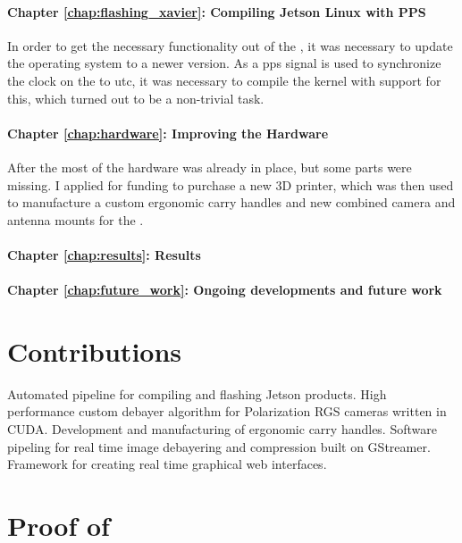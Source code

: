 \paragraph{Chapter \ref{chap:flashing_xavier}: Compiling Jetson Linux with PPS}
In order to get the necessary functionality out of the \jx, it was necessary to update the operating system to a newer version.
As a \gls{pps} signal is used to synchronize the clock on the \jx to \gls{utc}, it was necessary to compile the kernel with support for this, which turned out to be a non-trivial task.

\paragraph{Chapter \ref{chap:hardware}: Improving the Hardware}
After the \preproject most of the hardware was already in place, but some parts were missing.
I applied for funding to purchase a new 3D printer, which was then used to manufacture a custom ergonomic carry handles and new combined camera and antenna mounts for the \sr.

\paragraph{Chapter \ref{chap:results}: Results}


\paragraph{Chapter \ref{chap:future_work}: Ongoing developments and future work}



\section{Contributions}
Automated pipeline for compiling and flashing Jetson products.
High performance custom debayer algorithm for Polarization RGS cameras written in CUDA.
Development and manufacturing of ergonomic carry handles.
Software pipeling for real time image debayering and compression built on GStreamer.
Framework for creating real time graphical web interfaces.

\section{Proof of }
